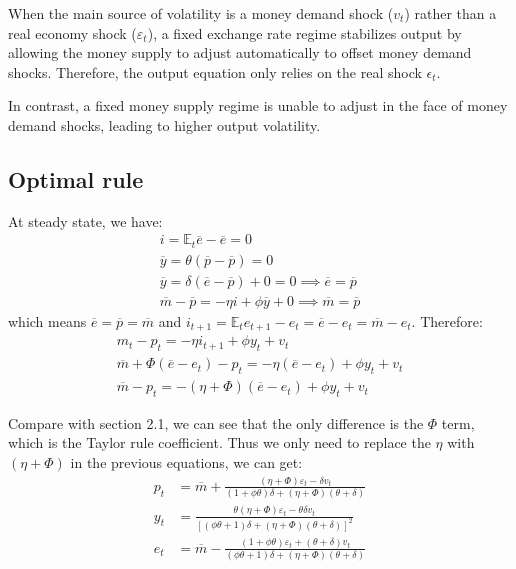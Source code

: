 \documentclass[a4paper,12pt]{article} %
\theoremstyle{nonitalic}
\begin{document}
When the main source of volatility is a money demand shock ($v_t$) rather than a real economy shock ($\varepsilon_t$),
a fixed exchange rate regime stabilizes output by allowing the money supply to adjust automatically to offset money demand shocks.
Therefore, the output equation only relies on the real shock $\epsilon_t$.

In contrast, a fixed money supply regime is unable to adjust in the face of money demand shocks,
leading to higher output volatility.

\subsection{Optimal rule}
At steady state, we have:
\begin{gather*}
    i = \mathbb{E}_t \overline{e} - \overline{e} = 0 \\
    \overline{y} = \theta(\overline{p} - \overline{p}) = 0 \\
    \overline{y} = \delta(\overline{e} - \overline{p}) + 0 = 0 \implies \overline{e} = \overline{p} \\
    \overline{m} - \overline{p} = -\eta i + \phi \overline{y} + 0 \implies \overline{m} = \overline{p}
\end{gather*}
which means $\overline{e} = \overline{p} = \overline{m}$ and $i_{t+1} = \mathbb{E}_t e_{t+1} - e_t = \overline{e} - e_t = \overline{m} - e_t$. Therefore:
\begin{gather*}
    m_t - p_t = -\eta i_{t+1} + \phi y_t + v_t \\
    \overline{m} + \Phi(\overline{e} - e_t) - p_t = -\eta (\overline{e} - e_t) + \phi y_t + v_t \\
    \overline{m} - p_t = -(\eta + \Phi)(\overline{e} - e_t) + \phi y_t + v_t
\end{gather*}

Compare with section 2.1, we can see that the only difference is the $\Phi$ term, which is the Taylor rule coefficient.
Thus we only need to replace the $\eta$ with $(\eta + \Phi)$ in the previous equations, we can get:
\begin{align*}
    p_t &= \overline{m} + \frac{(\eta + \Phi ) \varepsilon_t - \delta v_t}{(1 + \phi \theta)\delta + (\eta + \Phi) (\theta + \delta)} \\
    y_t &= \frac{\theta (\eta + \Phi) \varepsilon_t - \theta \delta v_t}{\left[ (\phi \theta + 1)\delta + (\eta + \Phi) (\theta + \delta) \right]^2} \\
    e_t &= \overline{m} - \frac{(1 + \phi \theta)\varepsilon_t + (\theta + \delta)v_t}{(\phi \theta + 1)\delta + (\eta + \Phi) (\theta + \delta)}
\end{align*}
\end{document}
